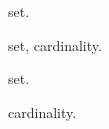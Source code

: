 \documentclass{article}
\begin{document}
\gls{set}.

\newpage
\gls{set}, \gls{cardinality}.

\newpage
\gls{set}.

\newpage
\gls{cardinality}.

\printterms[columns=1,style=align]
\end{document}
